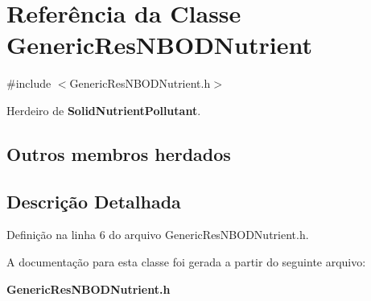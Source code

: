 \section{Referência da Classe Generic\+Res\+N\+B\+O\+D\+Nutrient}
\label{class_generic_res_n_b_o_d_nutrient}


{\ttfamily \#include $<$Generic\+Res\+N\+B\+O\+D\+Nutrient.\+h$>$}



Herdeiro de {\bf Solid\+Nutrient\+Pollutant}.

\subsection*{Outros membros herdados}


\subsection{Descrição Detalhada}


Definição na linha 6 do arquivo Generic\+Res\+N\+B\+O\+D\+Nutrient.\+h.



A documentação para esta classe foi gerada a partir do seguinte arquivo\+:\begin{DoxyCompactItemize}
\item 
{\bf Generic\+Res\+N\+B\+O\+D\+Nutrient.\+h}\end{DoxyCompactItemize}
